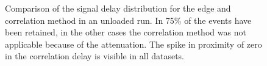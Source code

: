  \begin{figure}[p]
\centering
   \hspace{1mm}
\caption{Comparison of the signal delay distribution for the edge and correlation method in an unloaded run. In 75\% of the events have been retained, in the other cases the correlation method was not applicable because of the attenuation.  The spike in proximity of zero in the correlation delay is visible in all datasets.\vspace{8mm}}
 \label{edge_vs_corr}


\end{figure}
